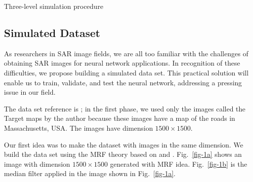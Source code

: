 \documentclass[
  journal,
]{IEEEtran}%
\begin{document}
\begin{algorithm}[hbt]
\SetAlgoLined
{}
\BlankLine
{}
\BlankLine
{}
\caption{Three-level simulation procedure}\label{Algo:SimulationOverview}
\end{algorithm}

\subsection{Simulated Dataset}\label{simulated-dataset}

As researchers in SAR image fields, we are all too familiar with the
challenges of obtaining SAR images for neural network applications. In
recognition of these difficulties, we propose building a simulated data
set. This practical solution will enable us to train, validate, and test
the neural network, addressing a pressing issue in our field.

The data set reference is ; in the
first phase, we used only the images called the Target maps by the
author because these images have a map of the roads in Massachusetts,
USA. The images have dimension \(1500 \times 1500\).

Our first idea was to make the dataset with images in the same
dimension. We build the data set using the MRF theory based on
 and
. Fig.~\ref{fig-1a} shows an
image with dimension \(1500 \times 1500\) generated with MRF idea.
Fig.~\ref{fig-1b} is the median filter applied in the image shown in
Fig.~\ref{fig-1a}.
\end{document}
